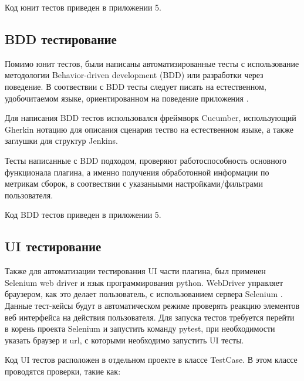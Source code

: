 Код юнит тестов приведен в приложении 5.

\subsection{BDD тестирование}

Помимо юнит тестов, были написаны автоматизированные тесты с использование методологии Behavior-driven development (BDD) или разработки через поведение. В соотвествии с BDD тесты следует писать на естественном, удобочитаемом языке, ориентированном на поведение приложения \cite{bdd}.

Для написания BDD тестов использовался фреймворк Cucumber, использующий Gherkin нотацию для описания сценария тество на естественном языке, а также заглушки для структур Jenkins.

Тесты написанные с BDD подходом, проверяют работоспособность основного функционала плагина, а именно получения обработонной информации по метрикам сборок, в соотвествии с указаныыми настройками/фильтрами пользователя.

Код BDD тестов приведен в приложении 5.

\subsection{UI тестирование}

Также для автоматизации тестирования UI части плагина, был применен Selenium web driver и язык программирования python. WebDriver управляет браузером, как это делает пользователь, с использованием сервера Selenium \cite{webdriver}. Данные тест-кейсы будут в автоматическом режиме проверять реакцию элементов веб интерфейса на действия пользователя. Для запуска тестов требуется перейти в корень проекта Selenium и запустить команду pytest, при необходимости указать браузер и url, с которыми необходимо запустить UI тесты.

Код UI тестов расположен в отдельном проекте в классе TestCase. В этом классе проводятся проверки, такие как:

